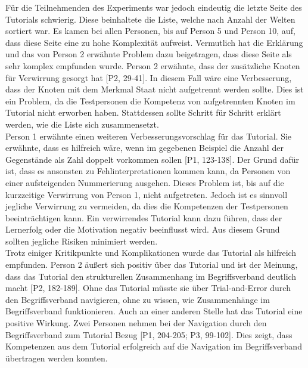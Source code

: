 Für die Teilnehmenden des Experiments war jedoch eindeutig die letzte Seite des Tutorials schwierig.
Diese beinhaltete die Liste, welche nach Anzahl der Welten sortiert war.
Es kamen bei allen Personen, bis auf Person 5 und Person 10, auf, dass diese Seite eine zu hohe Komplexität aufweist.
Vermutlich hat die Erklärung und das von Person 2 erwähnte Problem dazu beigetragen, dass diese Seite als sehr komplex empfunden wurde.
Person 2 erwähnte, dass der zusätzliche Knoten für Verwirrung gesorgt hat [P2, 29-41].
In diesem Fall wäre eine Verbesserung, dass der Knoten mit dem Merkmal Staat nicht aufgetrennt werden sollte.
Dies ist ein Problem, da die Testpersonen die Kompetenz von aufgetrennten Knoten im Tutorial nicht erworben haben.
Stattdessen sollte Schritt für Schritt erklärt werden, wie die Liste sich zusammensetzt.\\

Person 1 erwähnte einen weiteren Verbesserungsvorschlag für das Tutorial.
Sie erwähnte, dass es hilfreich wäre, wenn im gegebenen Beispiel die Anzahl der Gegenstände als Zahl doppelt vorkommen sollen [P1, 123-138].
Der Grund dafür ist, dass es ansonsten zu Fehlinterpretationen kommen kann, da Personen von einer aufsteigenden Nummerierung ausgehen.
Dieses Problem ist, bis auf die kurzzeitige Verwirrung von Person 1, nicht aufgetreten.
Jedoch ist es sinnvoll jegliche Verwirrung zu vermeiden, da dies die Kompetenzen der Testpersonen beeinträchtigen kann.
Ein verwirrendes Tutorial kann dazu führen, dass der Lernerfolg oder die Motivation negativ beeinflusst wird.
Aus diesem Grund sollten jegliche Risiken minimiert werden. \\

Trotz einiger Kritikpunkte und Komplikationen wurde das Tutorial als hilfreich empfunden.
Person 2 äußert sich positiv über das Tutorial und ist der Meinung, dass das Tutorial den strukturellen Zusammenhang im Begriffsverband deutlich macht [P2, 182-189].
Ohne das Tutorial müsste sie über Trial-and-Error durch den Begriffsverband navigieren, ohne zu wissen, wie Zusammenhänge im Begriffsverband funktionieren.
Auch an einer anderen Stelle hat das Tutorial eine positive Wirkung.
Zwei Personen nehmen bei der Navigation durch den Begriffsverband zum Tutorial Bezug [P1, 204-205; P3, 99-102].
Dies zeigt, dass Kompetenzen aus dem Tutorial erfolgreich auf die Navigation im Begriffsverband übertragen werden konnten.\\


